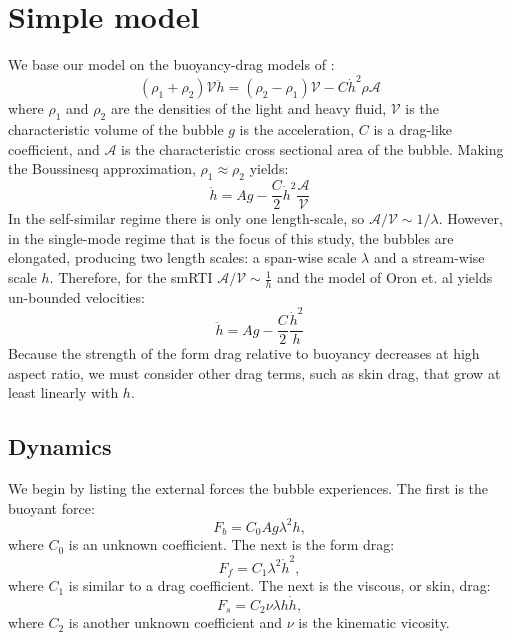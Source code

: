 \section{Simple model}

We base our model on the buoyancy-drag models of \cite{Oron2001}:
\begin{equation}
(\rho_1 + \rho_2) \mathcal{V} \ddot{h} = (\rho_2 - \rho_1) \mathcal{V} - C \dot{h}^2 \rho \mathcal{A}
\end{equation}
where $\rho_1$ and $\rho_2$ are the densities of the light and heavy fluid,
$\mathcal{V}$ is the characteristic volume of the bubble
$g$ is the acceleration,
$C$ is a drag-like coefficient, and
$\mathcal{A}$ is the characteristic cross sectional area of the bubble.
Making the Boussinesq approximation, $\rho_1 \approx \rho_2$ yields:
\begin{equation}
\ddot{h} = A g - \frac{C}{2} \dot{h}^2 \frac{\mathcal{A}}{\mathcal{V}}
\end{equation}
In the self-similar regime there is only one length-scale, so $\mathcal{A}/\mathcal{V} \sim 1 / \lambda$.
However, in the single-mode regime that is the focus of this study, the bubbles are elongated, producing two length scales: a span-wise scale $\lambda$ and a stream-wise scale $h$.
Therefore, for the smRTI $\mathcal{A}/\mathcal{V} \sim \frac{1}{h}$ and the model of Oron et. al yields un-bounded velocities:
\begin{equation}
\ddot{h} = A g - \frac{C}{2} \frac{\dot{h}^2}{h}
\end{equation}
Because the strength of the form drag relative to buoyancy decreases at high aspect ratio, we must consider other drag terms, such as skin drag, that grow at least linearly with $h$.

\subsection{Dynamics}

We begin by listing the external forces the bubble experiences.  The first is the buoyant force:
\begin{equation}
F_b = C_0 A g \lambda^2 h,
\end{equation}
where $C_0$ is an unknown coefficient.
The next is the form drag:
\begin{equation}
F_f = C_1 \lambda^2 \dot{h}^2,
\end{equation}
where $C_1$ is similar to a drag coefficient.
The next is the viscous, or skin, drag:
\begin{equation}
F_s = C_2 \nu \lambda h \dot{h},
\end{equation}
where $C_2$ is another unknown coefficient and 
$\nu$ is the kinematic vicosity.


